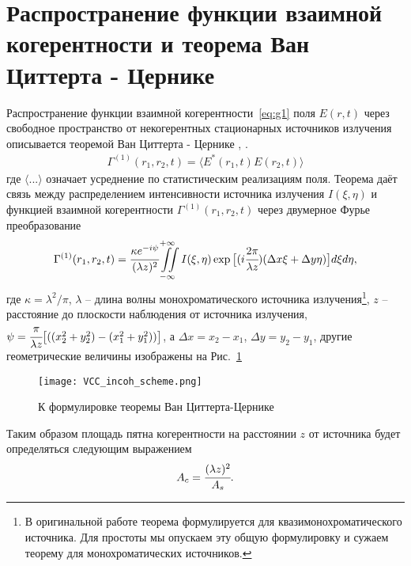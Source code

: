\section{Распространение функции взаимной когерентности и теорема Ван Циттерта - Цернике}
Распространение функции взаимной когерентности~\ref{eq:g1} поля $E(r, t)$ через свободное пространство от некогерентных стационарных источников излучения описывается теоремой Ван Циттерта - Цернике \cite{van_cittert_wahrscheinliche_1934}, \cite{zernike_concept_1938}. 
\begin{align}
	\Gamma^{(1)} (r_1, r_2, t) = \big \langle {E}^*(r_1, t) {E}(r_2, t) \big \rangle
	\label{eq:g1} 
\end{align}
где $\big \langle ... \big \rangle$ означает усреднение по статистическим реализациям поля. Теорема даёт связь между распределением интенсивности источника излучения $I(\xi, \eta)$ и функцией взаимной когерентности $\Gamma^{(1)} (r_1, r_2, t)$ через двумерное Фурье преобразование
\begin{align}
	\Gamma^{(1)} (r_1, r_2, t) = \cfrac{\kappa e^{-i\psi}}{({\lambda}z)^2} \iint \limits_{-\infty}^{+\infty} I(\xi, \eta) \exp{\big [(i \cfrac{2 \pi}{{\lambda}z}) (\Delta x \xi + \Delta y \eta)\big]}d\xi d\eta, 
	\label{eq:van_cittert_zernike_theorem} 
\end{align}
где $\kappa = {\lambda}^2 / \pi$, ${\lambda}$ -- длина волны монохроматического источника излучения\footnote{В оригинальной работе теорема формулируется для квазимонохроматического источника. Для простоты мы опускаем эту общую формулировку и сужаем теорему для монохроматических источников.}, $z$ -- расстояние до плоскости наблюдения от источника излучения, $\psi = \cfrac{\pi}{{\lambda} z}\big[((x^2_2 + y^2_2) - (x^2_1 + y^2_1)) \big]$, а $\Delta x = x_2 - x_1$, $\Delta y = y_2 - y_1$, другие геометрические величины изображены на Рис.~\ref{fig:VCC_scheme_incoh} 
\begin{figure}[H] 
	\centering 	\texttt{[image: VCC\_incoh\_scheme.png]}
	\caption{К формулировке теоремы Ван Циттерта-Цернике}
	\label{fig:VCC_scheme_incoh}
\end{figure}
Таким образом площадь пятна когерентности на расстоянии $z$ от источника будет определяться следующим выражением
\begin{align}
	A_c = \cfrac{({\lambda} z)^2}{A_s}.
	\label{eq:VCC}
\end{align}

